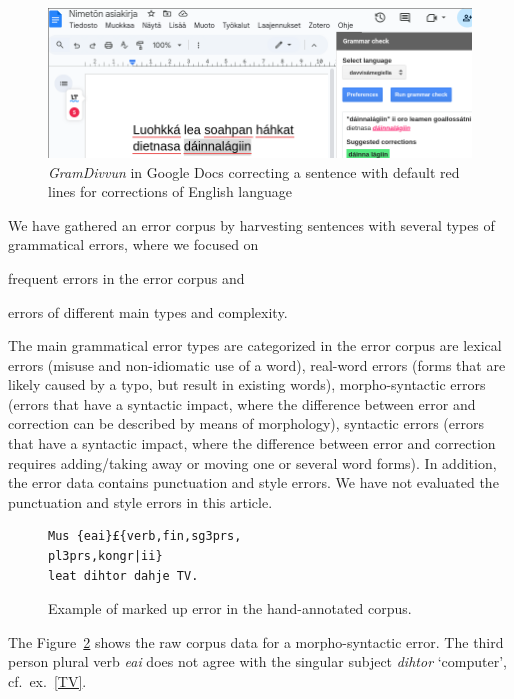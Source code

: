 \documentclass[free]{flammie}
\begin{document}
\begin{figure}
    \includegraphics[width=\textwidth]{gramdivvun.png}
    \caption{\textit{GramDivvun} in Google Docs correcting a
    sentence with default red lines for corrections of English
    language\label{fig:gramdivvun}}
\end{figure}


We have gathered an error corpus by harvesting sentences with several types of
grammatical errors, where we focused on
\begin{enumerate*}
    \item frequent errors in the error corpus
and
    \item errors of different main types and complexity.
\end{enumerate*}
The main grammatical error
types are categorized in the error corpus are lexical
errors (misuse and non-idiomatic use of a word), real-word errors (forms that are
likely caused by a typo, but result in existing words), morpho-syntactic errors
(errors that have a syntactic impact, where the difference between error and
correction can be described by means of morphology), syntactic errors (errors
that have a syntactic impact, where the difference between error and correction
requires adding/taking away or moving one or several word forms). In addition,
the error data contains punctuation and style errors. We have not evaluated the
punctuation and style errors in this article.


\begin{figure}
    \begin{verbatim}
Mus {eai}£{verb,fin,sg3prs,
pl3prs,kongr|ii}
leat dihtor dahje TV.
    \end{verbatim}
    \caption{Example of marked up error in the hand-annotated
    corpus.\label{markup}}
\end{figure}

The Figure~\ref{markup} shows the raw corpus data for a morpho-syntactic error.
The third person plural verb \textit{eai} does not agree with the singular
subject \textit{dihtor} `computer', cf.\ ex.~\ref{TV}.
\end{document}
